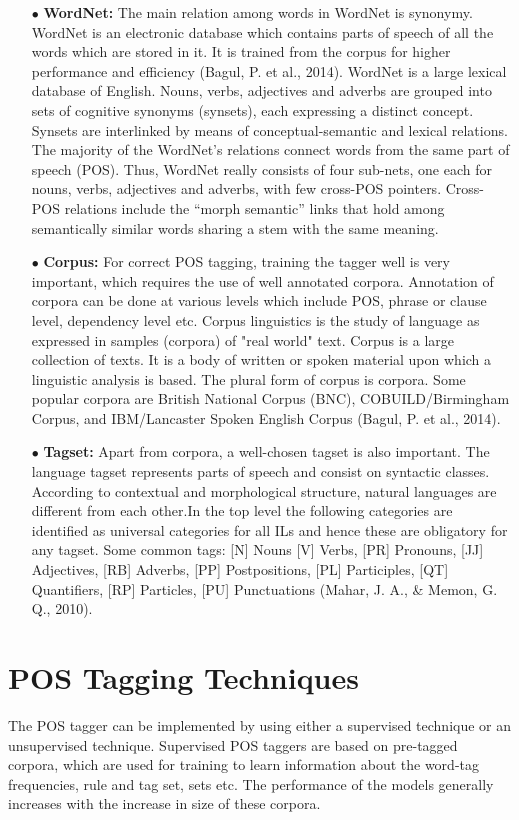 \documentclass[12pt,a4paper,oneside]{memoir}
\begin{document}
\begin{itemize}
  \item[$\bullet$] \textbf{WordNet:}  The main relation among words in WordNet is synonymy. WordNet is an electronic database which contains parts of speech of all the words which are stored in it. It is trained from the corpus for higher performance and efficiency (Bagul, P. et al., 2014).  WordNet is a large lexical database of English. Nouns, verbs, adjectives and adverbs are grouped into sets of cognitive synonyms (synsets), each expressing a distinct concept. Synsets are interlinked by means of conceptual-semantic and lexical relations. The majority of the WordNet’s relations connect words from the same part of speech (POS). Thus, WordNet really consists of four sub-nets, one each for nouns, verbs, adjectives and adverbs, with few cross-POS pointers. Cross-POS relations include the “morph semantic” links that hold among semantically similar words sharing a stem with the same meaning.
  \item[$\bullet$] \textbf{Corpus:} For correct POS tagging, training the tagger well is very important, which requires the use of well annotated corpora. Annotation of corpora can be done at various levels which include POS, phrase or clause level, dependency level etc. Corpus linguistics is the study of language as expressed in samples (corpora) of "real world" text. Corpus is a large collection of texts. It is a body of written or spoken material upon which a linguistic analysis is based. The plural form of corpus is corpora. Some popular corpora are British National Corpus (BNC), COBUILD/Birmingham Corpus, and IBM/Lancaster Spoken English Corpus (Bagul, P. et al., 2014). 

  \item[$\bullet$] \textbf{Tagset:} Apart from corpora, a well-chosen tagset is also important. The language tagset represents parts of speech and consist on syntactic classes. According to contextual and morphological structure, natural languages are different from each other.In the top level the following categories are identified as universal categories for all ILs and hence these are obligatory for any tagset. Some common tags: [N] Nouns [V] Verbs, [PR] Pronouns, [JJ] Adjectives, [RB] Adverbs, [PP] Postpositions, [PL] Participles, [QT] Quantifiers, [RP] Particles, [PU] Punctuations (Mahar, J. A., \& Memon, G. Q., 2010).	
\end{itemize}

\section{POS Tagging Techniques}
The POS tagger can be implemented by using either a supervised technique or an unsupervised technique. Supervised POS taggers are based on pre-tagged corpora, which are used for training to learn information about the word-tag frequencies, rule and tag set, sets etc. The performance of the models generally increases with the increase in size of these corpora. 
\end{document}
